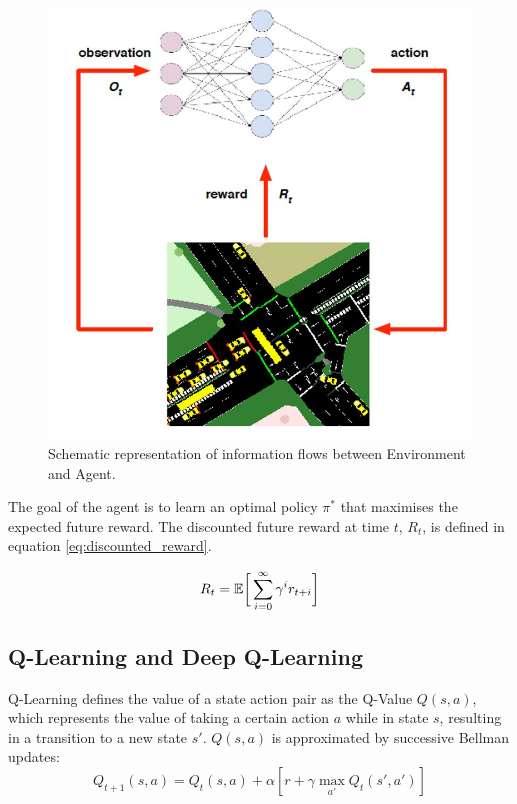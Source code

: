 \documentclass[conference]{IEEEtran}
\begin{document}
\begin{figure}[thpb]
    \centering
    \includegraphics[width=\linewidth]{figures/rl.PNG}
    \caption{Schematic representation of information flows between Environment and Agent.}
    \label{fig:RL}
\end{figure}

The goal of the agent is to learn an optimal policy $\pi^*$ that maximises the expected future reward. The discounted future reward at time $t$, $R_t$, is defined in equation \eqref{eq:discounted_reward}.

\begin{equation}
R_t = \mathbb{E} \bigg{[} \sum^{\infty}_{i=0} \gamma^i r_{t+i} \bigg{]} 
\label{eq:discounted_reward}     
\end{equation}

\subsection{Q-Learning and Deep Q-Learning}
Q-Learning \cite{watkins} defines the value of a state action pair as the Q-Value $Q(s,a)$, which represents the value of taking a certain action $a$ while in state $s$, resulting in a transition to a new state $s'$.
$Q(s,a)$ is approximated by successive Bellman updates:
\begin{equation}
    Q_{t+1}(s,a) = Q_t(s,a) + \alpha [r + \gamma \max_{a'}Q_t(s',a')]
\label{eq:bellman}
\end{equation}
\end{document}
